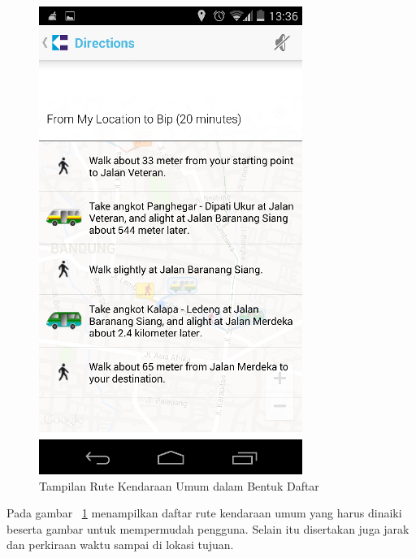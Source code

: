 \begin{figure}[h]
	\centering
		\includegraphics[scale=0.5]{Gambar/KIRI_Android/tampilan_daftar}
	\caption{Tampilan Rute Kendaraan Umum dalam Bentuk Daftar}
	\label{fig:daftar}
\end{figure}

Pada gambar ~\ref{fig:daftar} menampilkan daftar rute kendaraan umum yang harus dinaiki beserta gambar untuk mempermudah pengguna. Selain itu disertakan juga jarak dan perkiraan waktu sampai di lokasi tujuan.

